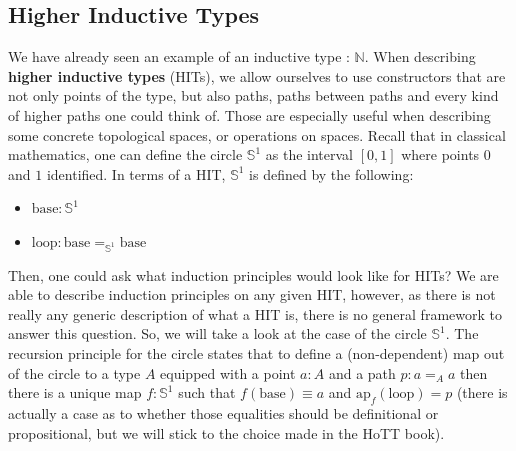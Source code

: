 \documentclass{report}
\begin{document}
\subsection{Higher Inductive Types}
We have already seen an example of an inductive type : $\mathbb N$. When describing \textbf{higher inductive types} (HITs), we allow ourselves to use constructors that are not only points of the type, but also paths, paths between paths and every kind of higher paths one could think of. Those are especially useful when describing some concrete topological spaces, or operations on spaces. Recall that in classical mathematics, one can define the circle $\mathbb{S}^1$ as the interval $[0,1]$ where points $0$ and $1$ identified. In terms of a HIT, $\mathbb{S}^1$ is defined by the following: \\
\begin{minipage}{.5\linewidth}
  \begin{itemize}
    \item $\mathrm{base} : \mathbb{S}^1$
    \item $\mathrm{loop} : \mathrm{base} =_{\mathbb{S}^1} \mathrm{base}$
  \end{itemize}
\end{minipage}
\hfill
\begin{minipage}{.5\linewidth}
  \begin{center}
  \end{center}
\end{minipage}
Then, one could ask what induction principles would look like for HITs? We are able to describe induction principles on any given HIT, however, as there is not really any generic description of what a HIT is, there is no general framework to answer this question. So, we will take a look at the case of the circle $\mathbb{S}^1$. The recursion principle for the circle states that to define a (non-dependent) map out of the circle to a type $A$ equipped with a point $a :A$ and a path $ p : a=_A a$ then there is a unique map $f : \mathbb{S}^1$ such that $f(\mathrm{base}) \equiv a$ and $\mathrm{ap}_f(\mathrm{loop}) =p$ (there is actually a case as to whether those equalities should be definitional or propositional, but we will stick to the choice made in the HoTT book).\\
\end{document}
